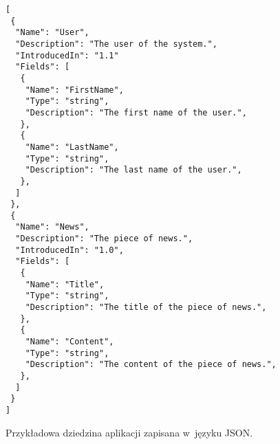 \begin{figure}[!ht]
\begin{verbatim}
[
 {
  "Name": "User",
  "Description": "The user of the system.",
  "IntroducedIn": "1.1"
  "Fields": [
   {
    "Name": "FirstName",
    "Type": "string",
    "Description": "The first name of the user.",
   },
   {
    "Name": "LastName",
    "Type": "string",
    "Description": "The last name of the user.",
   },
  ]
 },
 {
  "Name": "News",
  "Description": "The piece of news.",
  "IntroducedIn": "1.0",
  "Fields": [
   {
    "Name": "Title",
    "Type": "string",
    "Description": "The title of the piece of news.",
   },
   {
    "Name": "Content",
    "Type": "string",
    "Description": "The content of the piece of news.",
   },
  ]
 }
]
\end{verbatim}

\caption{Przykładowa dziedzina aplikacji zapisana w~języku JSON.}
\label{fig:implementation_core:json}
\end{figure}
